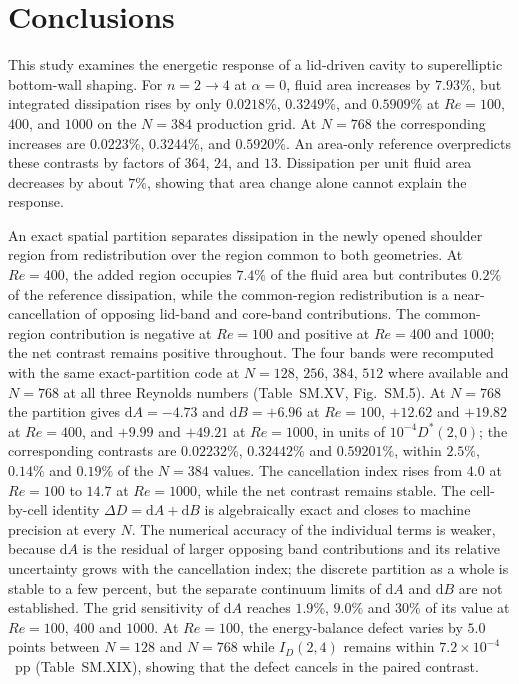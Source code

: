 \section{Conclusions}
\label{sec:conclusions}

This study examines the energetic response of a lid-driven cavity to superelliptic bottom-wall shaping. For $n=2\to4$ at $\alpha=0$, fluid area increases by $7.93\%$, but integrated dissipation rises by only $0.0218\%$, $0.3249\%$, and $0.5909\%$ at $Re=100$, $400$, and $1000$ on the $N=384$ production grid. At $N=768$ the corresponding increases are $0.0223\%$, $0.3244\%$, and $0.5920\%$. An area-only reference overpredicts these contrasts by factors of $364$, $24$, and $13$. Dissipation per unit fluid area decreases by about $7\%$, showing that area change alone cannot explain the response.

An exact spatial partition separates dissipation in the newly opened shoulder region from redistribution over the region common to both geometries. At $Re=400$, the added region occupies $7.4\%$ of the fluid area but contributes $0.2\%$ of the reference dissipation, while the common-region redistribution is a near-cancellation of opposing lid-band and core-band contributions. The common-region contribution is negative at $Re=100$ and positive at $Re=400$ and $1000$; the net contrast remains positive throughout. The four bands were recomputed with the same exact-partition code at $N=128$, $256$, $384$, $512$ where available and $N=768$ at all three Reynolds numbers (Table~SM.XV, Fig.~SM.5). At $N=768$ the partition gives $\mathrm{d}A=-4.73$ and $\mathrm{d}B=+6.96$ at $Re=100$, $+12.62$ and $+19.82$ at $Re=400$, and $+9.99$ and $+49.21$ at $Re=1000$, in units of $10^{-4}D^*(2,0)$; the corresponding contrasts are $0.02232\%$, $0.32442\%$ and $0.59201\%$, within $2.5\%$, $0.14\%$ and $0.19\%$ of the $N=384$ values. The cancellation index rises from $4.0$ at $Re=100$ to $14.7$ at $Re=1000$, while the net contrast remains stable. The cell-by-cell identity $\Delta D=\mathrm{d}A+\mathrm{d}B$ is algebraically exact and closes to machine precision at every $N$. The numerical accuracy of the individual terms is weaker, because $\mathrm{d}A$ is the residual of larger opposing band contributions and its relative uncertainty grows with the cancellation index; the discrete partition as a whole is stable to a few percent, but the separate continuum limits of $\mathrm{d}A$ and $\mathrm{d}B$ are not established. The grid sensitivity of $\mathrm{d}A$ reaches $1.9\%$, $9.0\%$ and $30\%$ of its value at $Re=100$, $400$ and $1000$. At $Re=100$, the energy-balance defect varies by $5.0$ points between $N=128$ and $N=768$ while $I_D(2,4)$ remains within $7.2\times10^{-4}$~pp (Table~SM.XIX), showing that the defect cancels in the paired contrast.

